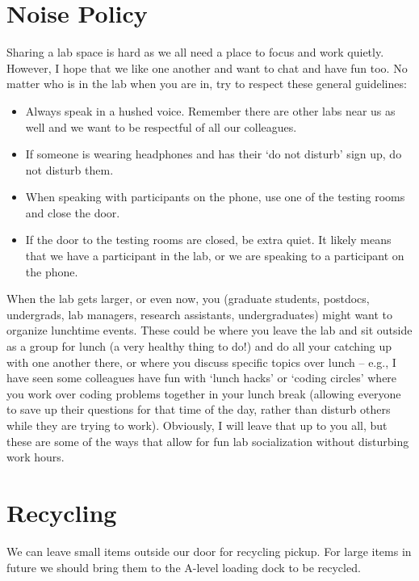 \documentclass[]{book}
\providecommand{\tightlist}{%
  \setlength{\itemsep}{0pt}\setlength{\parskip}{0pt}}
\begin{document}
\hypertarget{noise-policy}{%
\section{Noise Policy}\label{noise-policy}}

Sharing a lab space is hard as we all need a place to focus and work quietly. However, I hope that we like one another and want to chat and have fun too. No matter who is in the lab when you are in, try to respect these general guidelines:

\begin{itemize}
\tightlist
\item
  Always speak in a hushed voice. Remember there are other labs near us as well and we want to be respectful of all our colleagues.
\item
  If someone is wearing headphones and has their `do not disturb' sign up, do not disturb them.
\item
  When speaking with participants on the phone, use one of the testing rooms and close the door.
\item
  If the door to the testing rooms are closed, be extra quiet. It likely means that we have a participant in the lab, or we are speaking to a participant on the phone.
\end{itemize}

When the lab gets larger, or even now, you (graduate students, postdocs, undergrads, lab managers, research assistants, undergraduates) might want to organize lunchtime events. These could be where you leave the lab and sit outside as a group for lunch (a very healthy thing to do!) and do all your catching up with one another there, or where you discuss specific topics over lunch -- e.g., I have seen some colleagues have fun with `lunch hacks' or `coding circles' where you work over coding problems together in your lunch break (allowing everyone to save up their questions for that time of the day, rather than disturb others while they are trying to work). Obviously, I will leave that up to you all, but these are some of the ways that allow for fun lab socialization without disturbing work hours.

\hypertarget{recycling}{%
\section{Recycling}\label{recycling}}

We can leave small items outside our door for recycling pickup. For large items in future we should bring them to the A-level loading dock to be recycled.
\end{document}
